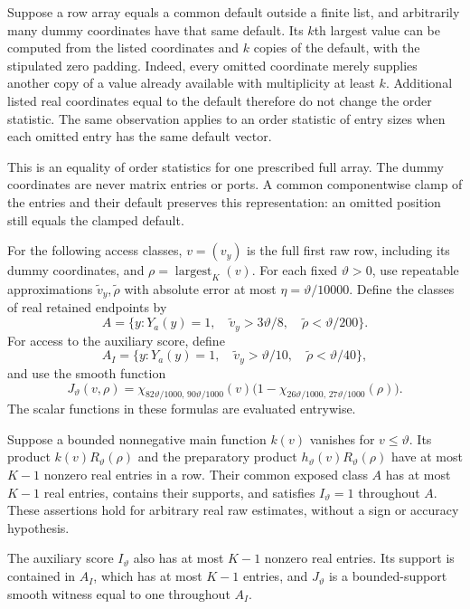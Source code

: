 \begin{remark}
\label{rem:atom-finite-ranks}
Suppose a row array equals a common default outside a finite list,
and arbitrarily many dummy coordinates have that same default.  Its
$k$th largest value can be computed from the listed coordinates and $k$ copies of
the default, with the stipulated zero padding.  Indeed, every omitted
coordinate merely supplies another copy of a value already available
with multiplicity at least $k$.  Additional listed real coordinates
equal to the default therefore do not change the order statistic.  The same
observation applies to an order statistic of entry sizes when each omitted entry
has the same default vector.

This is an equality of order statistics for one prescribed full array.  The dummy
coordinates are never matrix entries or ports.  A common componentwise
clamp of the entries and their default preserves this representation:
an omitted position still equals the clamped default.
\end{remark}

For the following access classes, $v=(v_y)$ is the full first raw
row, including its dummy coordinates, and $\rho=\operatorname{largest}_K(v)$.
For each fixed $\vartheta>0$, use repeatable approximations
$\widetilde v_y,\widetilde\rho$ with absolute error at most
$\eta=\vartheta/10000$. Define the classes of real retained endpoints by
\begin{equation}
 A=\{y:Y_a(y)=1,\quad
       \widetilde v_y>3\vartheta/8,\quad
       \widetilde\rho<\vartheta/200\}.
 \label{eq:atom-exposed-class}
\end{equation}
For access to the auxiliary score, define
\[
 A_I=\{y:Y_a(y)=1,\quad
       \widetilde v_y>\vartheta/10,\quad
       \widetilde\rho<\vartheta/40\},
\]
and use the smooth function
\[
 J_{\vartheta}(v,\rho)=
  \chi_{82\vartheta/1000,\,90\vartheta/1000}(v)
  \bigl(1-\chi_{26\vartheta/1000,\,27\vartheta/1000}(\rho)\bigr).
\]
The scalar functions in these formulas are evaluated entrywise.

\begin{lemma}
\label{lem:atom-margins}
Suppose a bounded nonnegative main function $k(v)$ vanishes for
$v\le\vartheta$.  Its product $k(v)R_{\vartheta}(\rho)$ and the
preparatory product $h_{\vartheta}(v)R_{\vartheta}(\rho)$ have at most
$K-1$ nonzero real entries in a row.  Their common exposed class
$A$ has at most $K-1$ real entries, contains their supports, and satisfies
$I_{\vartheta}=1$ throughout $A$.  These assertions hold for arbitrary
real raw estimates, without a sign or accuracy hypothesis.

The auxiliary score $I_{\vartheta}$ also has at most $K-1$ nonzero real
entries. Its support is contained in $A_I$, which has at most $K-1$
entries, and $J_{\vartheta}$ is a bounded-support smooth witness equal
to one throughout $A_I$.
\end{lemma}

